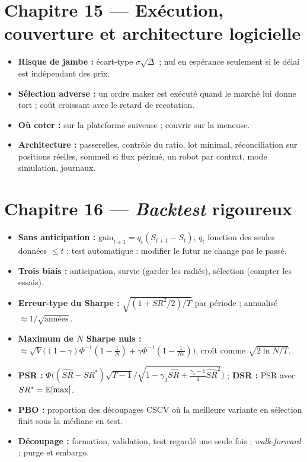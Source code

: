 \section*{Chapitre 15 — Exécution, couverture et architecture logicielle}
\begin{itemize}[leftmargin=1.2em,itemsep=0.05em]
\item \textbf{Risque de jambe :} écart-type $\sigma\sqrt\Delta$ ; nul en espérance seulement si le délai est indépendant des prix.
\item \textbf{Sélection adverse :} un ordre maker est exécuté quand le marché lui donne tort ; coût croissant avec le retard de recotation.
\item \textbf{Où coter :} sur la plateforme suiveuse ; couvrir sur la meneuse.
\item \textbf{Architecture :} passerelles, contrôle du ratio, lot minimal, réconciliation sur positions réelles, sommeil si flux périmé, un robot par contrat, mode simulation, journaux.
\end{itemize}

\section*{Chapitre 16 — \emph{Backtest} rigoureux}
\begin{itemize}[leftmargin=1.2em,itemsep=0.05em]
\item \textbf{Sans anticipation :} $\text{gain}_{t+1} = q_t(S_{t+1}-S_t)$, $q_t$ fonction des seules données $\le t$ ; test automatique : modifier le futur ne change pas le passé.
\item \textbf{Trois biais :} anticipation, survie (garder les radiés), sélection (compter les essais).
\item \textbf{Erreur-type du Sharpe :} $\sqrt{(1+SR^2/2)/T}$ par période ; annualisé $\approx 1/\sqrt{\text{années}}$.
\item \textbf{Maximum de $N$ Sharpe nuls :} $\approx\sqrt V\big((1-\gamma)\Phi^{-1}(1-\tfrac1N) + \gamma\Phi^{-1}(1-\tfrac{1}{Ne})\big)$, croît comme $\sqrt{2\ln N/T}$.
\item \textbf{PSR :} $\Phi\big((\widehat{SR}-SR^\ast)\sqrt{T-1}/\sqrt{1-\gamma_3\widehat{SR}+\frac{\gamma_4-1}{4}\widehat{SR}^2}\big)$ ; \textbf{DSR :} PSR avec $SR^\ast = \mathbb{E}[\max]$.
\item \textbf{PBO :} proportion des découpages CSCV où la meilleure variante en sélection finit sous la médiane en test.
\item \textbf{Découpage :} formation, validation, test regardé une seule fois ; \emph{walk-forward} ; purge et embargo.
\end{itemize}

